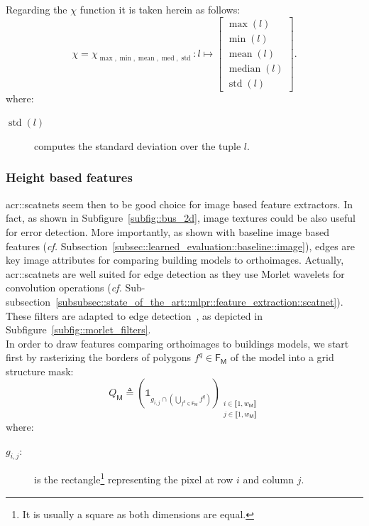             Regarding the \(\chi\) function it is taken herein as follows:
            \begin{equation}
                \label{eq::max_min_mean_med_std_extractor}
                \chi = \chi_{\max,\min,\operatorname{mean},\operatorname{med},\operatorname{std}}: l \mapsto \begin{bmatrix}
                    \max(l)\\
                    \min(l)\\
                    \operatorname{mean}(l)\\
                    \operatorname{median}(l)\\
                    \operatorname{std}(l)
                \end{bmatrix}.
            \end{equation}
            where:
            \begin{description}
                \item[\(\operatorname{std}(l)\)] computes the standard deviation over the tuple \(l\).
            \end{description}

        \subsubsection{Height based features}
            \glspl{acr::scatnet} seem then to be good choice for image based feature extractors.
            In fact, as shown in Subfigure~\ref{subfig::bus_2d}, image textures could be also useful for error detection.
            More importantly, as shown with baseline image based features (\textit{cf.} Subsection~\ref{subsec::learned_evaluation::baseline::image}), edges are key image attributes for comparing building models to orthoimages.
            Actually, \glspl{acr::scatnet} are well suited for edge detection as they use Morlet wavelets for convolution operations (\textit{cf.} Sub-subsection~\ref{subsubsec::state_of_the_art::mlpr::feature_extraction::scatnet}).
            These filters are adapted to edge detection~\parencite{zhang2007radon}, as depicted in Subfigure~\ref{subfig::morlet_filters}.\\

            In order to draw features comparing orthoimages to buildings models, we start first by rasterizing the borders of polygons \(f^q \in \mathsf{F_M}\) of the model into a grid structure mask:
            \begin{equation}
                \label{eq::borders_mask}
                Q_{\mathsf{M}} \triangleq \left(\mathbb{1}_{g_{i,j} \cap \left(\bigcup_{f^q \in \mathsf{F_M}}f^q\right)}\right)_{\substack{i \in \llbracket 1, w_\mathsf{M} \rrbracket\\j \in \llbracket 1, w_\mathsf{M} \rrbracket}}
            \end{equation}
            where:
            \begin{description}
                \item[\(g_{i,j}\):] is the rectangle\footnote{It is usually a square as both dimensions are equal.} representing the pixel at row \(i\) and column \(j\).
            \end{description}

